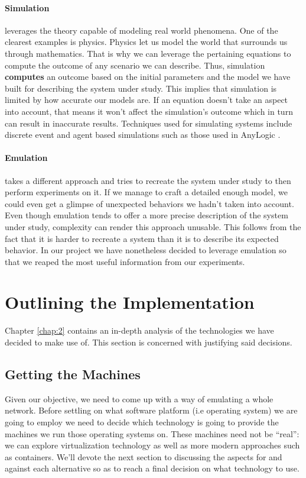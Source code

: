             \paragraph{Simulation} leverages the theory capable of modeling real world phenomena. One of the clearest examples is physics. Physics let us model the world that surrounds us through mathematics. That is why we can leverage the pertaining equations to compute the outcome of any scenario we can describe. Thus, simulation \textbf{computes} an outcome based on the initial parameters and the model we have built for describing the system under study. This implies that simulation is limited by how accurate our models are. If an equation doesn't take an aspect into account, that means it won't affect the simulation's outcome which in turn can result in inaccurate results. Techniques used for simulating systems include discrete event and agent based simulations such as those used in AnyLogic \cite{bib:anylogic}.\\

            \paragraph{Emulation} takes a different approach and tries to recreate the system under study to then perform experiments on it. If we manage to craft a detailed enough model, we could even get a glimpse of unexpected behaviors we hadn't taken into account. Even though emulation tends to offer a more precise description of the system under study, complexity can render this approach unusable. This follows from the fact that it is harder to recreate a system than it is to describe its expected behavior. In our project we have nonetheless decided to leverage emulation so that we reaped the most useful information from our experiments.\\

    \section{Outlining the Implementation}
        Chapter \ref{chap:2} contains an in-depth analysis of the technologies we have decided to make use of. This section is concerned with justifying said decisions.

        \subsection{Getting the Machines}
            Given our objective, we need to come up with a way of emulating a whole network. Before settling on what software platform (i.e operating system) we are going to employ we need to decide which technology is going to provide the machines we run those operating systems on. These machines need not be ``real'': we can explore virtualization technology as well as more modern approaches such as containers. We'll devote the next section to discussing the aspects for and against each alternative so as to reach a final decision on what technology to use.\\

